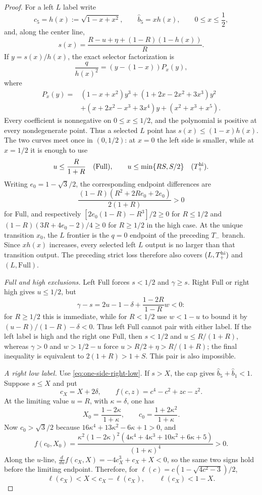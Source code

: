 \begin{proof}
For a left $L$ label write
\[
 c_5=h(x):=\sqrt{1-x+x^2},\qquad
 \widehat b_5=xh(x),\qquad 0\le x\le\frac12,
\]
and, along the center line,
\[
 s(x)=\frac{R-u+\eta+(1-R)(1-h(x))}{R}.
\]
If $y=s(x)/h(x)$, the exact selector factorization is
\[
 \frac{q}{h(x)^2}=(y-(1-x))P_x(y),
\]
where
\begin{align*}
 P_x(y)={}&(1-x+x^2)y^3+(1+2x-2x^2+3x^3)y^2\\
 &+(x+2x^2-x^3+3x^4)y+(x^2+x^3+x^5).
\end{align*}
Every coefficient is nonnegative on $0\le x\le1/2$, and the polynomial is
positive at every nondegenerate point.  Thus a selected $L$ point has
$s(x)\le(1-x)h(x)$.  The two curves meet once in $(0,1/2)$: at $x=0$ the
left side is smaller, while at $x=1/2$ it is enough to use
\[
 u\le\frac{R}{1+R}\quad(\mathrm{Full}),\qquad
 u\le\min\{RS,S/2\}\quad(T_+^{\rm hi}).
\]
Writing $e_0=1-\sqrt3/2$, the corresponding endpoint differences are
\[
 \frac{(1-R)(R^2+2Re_0+2e_0)}{2(1+R)}>0
\]
for Full, and respectively
$[2e_0(1-R)-R^3]/2\ge0$ for $R\le1/2$ and
$(1-R)(3R+4e_0-2)/4\ge0$ for $R\ge1/2$ in the high case.
At the unique transition $x_0$, the $L$ frontier is the $q=0$ endpoint of
the preceding $T_-$ branch.  Since $xh(x)$ increases, every selected left
$L$ output is no larger than that transition output.  The preceding strict
loss therefore also covers $(L,T_+^{\rm hi})$ and $(L,\mathrm{Full})$.

\smallskip\noindent
\emph{Full and high exclusions.}
Left Full forces $s<1/2$ and $\gamma\ge s$.  Right Full or right high gives
$u\le1/2$, but
\[
 \gamma-s=2u-1-\delta+\frac{1-2R}{1-R}w<0:
\]
for $R\ge1/2$ this is immediate, while for $R<1/2$ use $w<1-u$ to bound it
by $(u-R)/(1-R)-\delta<0$.  Thus left Full cannot pair with either label.
If the left label is high and the right one Full, then $s<1/2$ and
$u\le R/(1+R)$, whereas $\gamma>0$ and $w>1/2-u$ force
$u>R/2+\eta>R/(1+R)$; the final inequality is equivalent to
$2(1+R)>1+S$.  This pair is also impossible.

\smallskip\noindent
\emph{A right low label.}
Use \eqref{eq:one-side-right-low}.  If $s>X$, the cap gives
$\widehat b_5+\widehat b_1<1$.  Suppose $s\le X$ and put
\[
 c_X=X+2\delta,\qquad f(c,z)=c^4-c^2+zc-z^2.
\]
At the limiting value $u=R$, with $\kappa=\delta$, one has
\[
 X_0=\frac{1-2\kappa}{1+\kappa},\qquad
 c_0=\frac{1+2\kappa^2}{1+\kappa}.
\]
Now $c_0>\sqrt3/2$ because
$16\kappa^4+13\kappa^2-6\kappa+1>0$, and
\[
 f(c_0,X_0)=
 \frac{\kappa^2(1-2\kappa)^2
 (4\kappa^4+4\kappa^3+10\kappa^2+6\kappa+5)}{(1+\kappa)^4}>0.
\]
Along the $u$-line,
$\frac d{du}f(c_X,X)=-4c_X^3+c_X+X<0$, so the same two signs hold before
the limiting endpoint.  Therefore, for
$\ell(c)=c(1-\sqrt{4c^2-3})/2$,
\[
 \ell(c_X)<X<c_X-\ell(c_X),\qquad \ell(c_X)<1-X.
\]


\end{proof}
